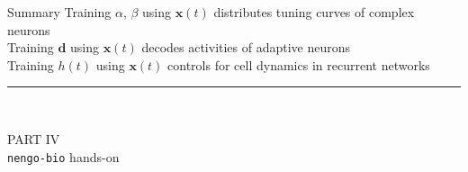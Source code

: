 \documentclass[aspectratio=169]{beamer}
\begin{document}
\begin{frame}{Summary}
Training $\alpha$, $\beta$ using $\mathbf{x}(t)$ distributes tuning curves of complex neurons \\
\vspace{0.5cm}
Training $\mathbf{d}$ using $\mathbf{x}(t)$ decodes activities of adaptive neurons \\
\vspace{0.5cm}
Training $h(t)$ using $\mathbf{x}(t)$ controls for cell dynamics in recurrent networks \\
\vspace{0.5cm}
\rule{\textwidth}{1pt}
{} \\
\end{frame}

\begin{frame}
\centering
\Large\textsc{PART IV}\\[0.5cm]
{\huge\color{violet}\texttt{nengo-bio} hands-on}
\end{frame}

%
%
%

\backupbegin

\backupend
\end{document}
